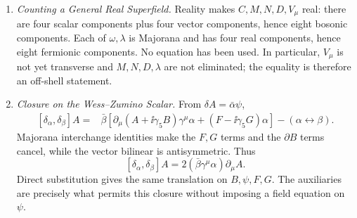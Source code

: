 
\begin{enumerate}
  \begin{enumerate}
    \item \emph{Counting a General Real Superfield.}
    Reality makes \(C,M,N,D,V_\mu\) real: there are four scalar components
      plus four vector components, hence eight bosonic components.  Each of
      \(\omega,\lambda\) is Majorana and has four real components, hence eight
      fermionic components.  No equation has been used.  In particular,
      \(V_\mu\) is not yet transverse and \(M,N,D,\lambda\) are not eliminated;
      the equality is therefore an off-shell statement.
    \item \emph{Closure on the Wess--Zumino Scalar.}
    From \(\delta A=\bar\alpha\psi\),
      \[
      \begin{aligned}
        [\delta_\alpha,\delta_\beta]A
         ={}&\bar\beta\!
           \left[\partial_\mu(A+\ii\gamma_5B)\gamma^\mu\alpha
                 +(F-\ii\gamma_5G)\alpha\right]-(\alpha\leftrightarrow\beta).
      \end{aligned}
      \]
      Majorana interchange identities make the \(F,G\) terms and the
      \(\partial B\) terms cancel, while the vector bilinear is antisymmetric.
      Thus
      \[
        [\delta_\alpha,\delta_\beta]A
          =2(\bar\beta\gamma^\mu\alpha)\partial_\mu A.
      \]
      Direct substitution gives the same translation on
      \(B,\psi,F,G\).  The auxiliaries are precisely what permits this closure
      without imposing a field equation on \(\psi\).
  \end{enumerate}


\end{enumerate}
